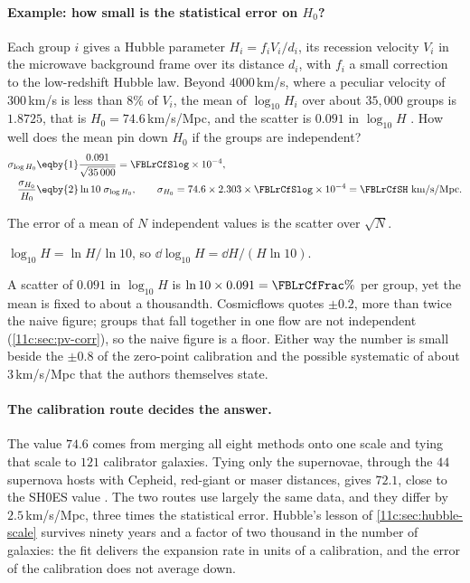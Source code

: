 \paragraph{Example: how small is the statistical error on $H_0$?} Each group $i$ gives a
Hubble parameter $H_i=f_iV_i/d_i$, its recession velocity $V_i$ in the microwave
background frame over its distance $d_i$, with $f_i$ a small correction to the
low-redshift Hubble law. Beyond $4000$\,km/s, where a peculiar velocity of
$300$\,km/s is less than $8\%$ of $V_i$, the mean of $\log_{10}H_i$ over about
$35{,}000$ groups is $1.8725$, that is $H_0=74.6$\,km/s/Mpc, and the scatter is
$0.091$ in $\log_{10}H$ \cite[Sec.~13]{Tully2023CF4}. How well does the mean pin down
$H_0$ if the groups are independent?
\begin{align}
  \sigma_{\log H_0}
  &\eqby{1}\frac{0.091}{\sqrt{35\,000}}=\FBLrCfSlog\times10^{-4},
  \nonumber\\
  \frac{\sigma_{H_0}}{H_0}
  &\eqby{2}\ln10\;\sigma_{\log H_0},
  \qquad
  \sigma_{H_0}=74.6\times2.303\times\FBLrCfSlog\times10^{-4}=\FBLrCfSH\ \text{km/s/Mpc}.
  \label{11c:eq:cf4-stat}
\end{align}
\begin{explain}
  \item The error of a mean of $N$ independent values is the scatter over $\sqrt N$.
  \item $\log_{10}H=\ln H/\ln10$, so $\dd\log_{10}H=\dd H/(H\ln10)$.
\end{explain}
A scatter of $0.091$ in $\log_{10}H$ is $\ln10\times0.091=\FBLrCfFrac\%$ per group, yet
the mean is fixed to about a thousandth. Cosmicflows quotes $\pm0.2$, more than twice
the naive figure; groups that fall together in one flow are not independent
(\cref{11c:sec:pv-corr}), so the naive figure is a floor. Either way the number is
small beside the $\pm0.8$ of the zero-point calibration and the possible systematic of
about $3$\,km/s/Mpc that the authors themselves state.

\paragraph{The calibration route decides the answer.} The value $74.6$ comes from
merging all eight methods onto one scale and tying that scale to $121$ calibrator
galaxies. Tying only the supernovae, through the $44$ supernova hosts with
Cepheid, red-giant or maser distances, gives $72.1$, close to the SH0ES value
\cite[Sec.~14]{Tully2023CF4}. The two routes use largely the same data, and they
differ by $2.5$\,km/s/Mpc, three times the statistical error. Hubble's lesson of
\cref{11c:sec:hubble-scale} survives ninety years and a factor of two thousand in the
number of galaxies: the fit delivers the expansion rate in units of a calibration, and
the error of the calibration does not average down.

